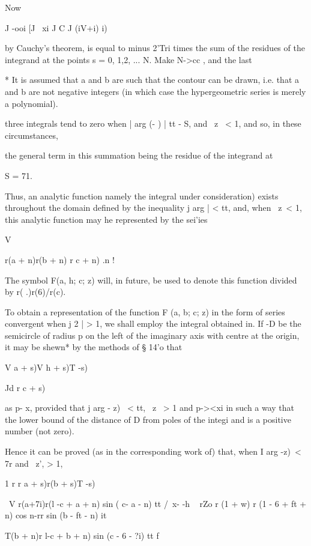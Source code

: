 Now

J -ooi [J ~xi J C J (iV+i) i)

by Cauchy's theorem, is equal to minus 2'Tri times the sum of the
residues of the integrand at the points s = 0, 1,2, ... N. Make N->cc
, and the last

* It is assumed that a and b are such that the contour can be drawn,
i.e. that a and b are not negative integers (in which case the
hypergeometric series is merely a polynomial).

%
%

three integrals tend to zero when | arg (- ) | tt - S, and \ z \ < 1,
and so, in these circumstances,

the general term in this summation being the residue of the integrand
at

S = 71.

Thus, an analytic function namely the integral under consideration)
exists throughout the domain defined by the inequality j arg | < tt,
and, when \ z\ < 1, this analytic function may he represented by the
sei'ies

V

r(a + n)r(b + n) r c + n) .n !

The symbol F(a, h; c; z) will, in future, be used to denote this
function divided by r( .)r(6)/r(c).


To obtain a representation of the function F (a, b; c; z) in the form
of series convergent when j 2 | > 1, we shall employ the integral
obtained in. If -D be the semicircle of radius p on the left of
the imaginary axis with centre at the origin, it may be shewn* by the
methods of § 14'o that

V a + s)V h + s)T -s)

Jd r c + s)

as p- x, provided that j arg - z) \ < tt, \ z \ > 1 and p-><xi in
such a way that the lower bound of the distance of D from poles of the
integi and is a positive number (not zero).

Hence it can be proved (as in the corresponding work of) that,
when I arg -z)\ < 7r and \ z', > 1,

1 r r a + s)r(b + s)T -s)

\ V r(a+7i)r(l -c + a + n) sin ( c- a - n) tt /\ x- -h ~ rZo r (1 + w)
r (1 - 6 + ft + n) cos n-rr sin (b - ft - n) it

  T(b + n)r l-c + b + n) sin (c - 6 - ?i) tt f \


